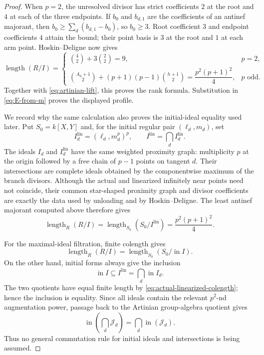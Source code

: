 \documentclass[12pt,a4paper]{article}
\theoremstyle{definition}
\newcommand{\length}{\operatorname{length}}
\begin{document}
\begin{proof}
When $p=2$, the unresolved divisor has strict coefficients $2$ at the root
and $4$ at each of the three endpoints.  If $b_0$ and $b_{d,1}$ are the
coefficients of an antinef majorant, then
$b_0\geq\sum_d(b_{d,1}-b_0)$, so $b_0\geq3$.  Root coefficient $3$ and
endpoint coefficients $4$ attain the bound; their point basis is $3$ at the
root and $1$ at each arm point.  Hoskin--Deligne now gives
\[
 \length(R/I)=
 \begin{cases}
 \binom42+3\binom22=9,&p=2,\\[2mm]
 \displaystyle
 \binom{A_0+1}{2}+(p+1)(p-1)\binom{h+1}{2}
 =\dfrac{p^2(p+1)^2}{4},&p\text{ odd}.
 \end{cases}
\]
Together with \eqref{eq:artinian-lift}, this proves the rank formula.
Substitution in \eqref{eq:E-from-m} proves the displayed profile.

We record why the same calculation also proves the initial-ideal equality
used later.  Put $S_0=k[X,Y]$ and, for the initial regular pair
$(\ell_d,m_d)$, set
\[
 I_d^{\mathrm{lin}}=(\ell_d,m_d^p)^p,\qquad
 I^{\mathrm{lin}}=\bigcap_d I_d^{\mathrm{lin}}.
\]
The ideals $I_d$ and $I_d^{\mathrm{lin}}$ have the same weighted proximity
graph: multiplicity $p$ at the origin followed by a free chain of $p-1$
points on tangent $d$.  Their intersections are complete ideals obtained by
the componentwise maximum of the branch divisors.  Although the actual and
linearized infinitely near points need not coincide, their common
star-shaped proximity graph and divisor coefficients are exactly the data
used by unloading and by Hoskin--Deligne.  The least antinef majorant computed
above therefore gives
\begin{equation}\label{eq:actual-linearized-colength}
 \length_R(R/I)=\length_{S_0}(S_0/I^{\mathrm{lin}})
 =\frac{p^2(p+1)^2}{4}.
\end{equation}

For the maximal-ideal filtration, finite colength gives
\[
 \length_R(R/I)=\length_{S_0}(S_0/\operatorname{in}I).
\]
On the other hand,
initial forms always give the inclusion
\[
 \operatorname{in}I\subseteq I^{\mathrm{lin}}
 =\bigcap_d\operatorname{in}I_d.
\]
The two quotients have equal finite length by
\eqref{eq:actual-linearized-colength}; hence the inclusion is equality.  Since
all ideals contain the relevant $p^2$-nd augmentation power, passage back to
the Artinian group-algebra quotient gives
\begin{equation}\label{eq:initial-intersection-equality}
 \operatorname{in}\!\left(\bigcap_d\mathcal J_d\right)
 =\bigcap_d\operatorname{in}(\mathcal J_d).
\end{equation}
Thus no general commutation rule for initial ideals and intersections is
being assumed.
\end{proof}
\end{document}
